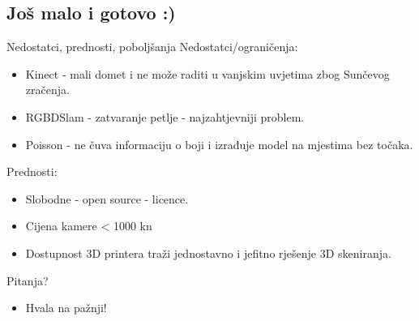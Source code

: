 \documentclass{beamer}
\begin{document}
\subsection{Još malo i gotovo :)}
\begin{frame}{Nedostatci, prednosti, poboljšanja}
    Nedostatci/ograničenja:
    \begin{itemize}
        \item <2-> Kinect - mali domet i ne može raditi u vanjskim
            uvjetima zbog Sunčevog zračenja.
        \item <3-> RGBDSlam - \alert{zatvaranje petlje} - najzahtjevniji problem.
        \item <4-> Poisson - ne čuva informaciju o boji i izrađuje model
            na mjestima bez točaka.
    \end{itemize}
    Prednosti:
    \begin{itemize}
        \item <5-> Slobodne - open source - licence.
        \item <6-> Cijena kamere < 1000 kn
        \item <7-> Dostupnost 3D printera traži jednostavno i jefitno
            rješenje 3D skeniranja.
    \end{itemize}
\end{frame}

\begin{frame}{Pitanja?}
    \begin{itemize}
        \item <1-> Hvala na pažnji!
    \end{itemize}
\end{frame}
\end{document}
